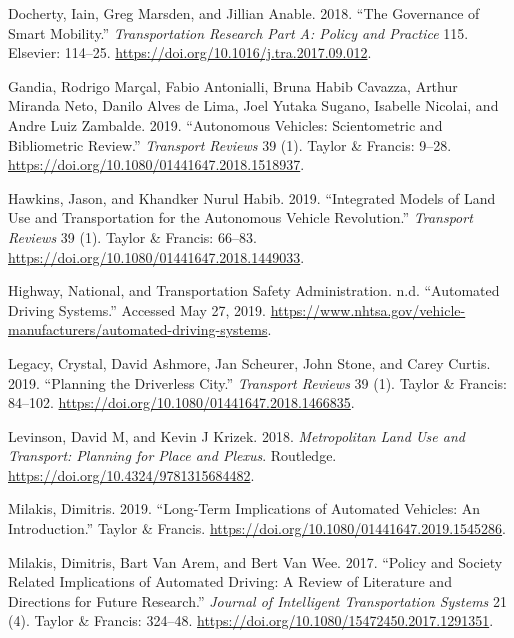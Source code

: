 \documentclass[12pt,]{article}
\begin{document}
\hypertarget{refs}{}
\leavevmode\hypertarget{ref-docherty2018governance}{}%
Docherty, Iain, Greg Marsden, and Jillian Anable. 2018. ``The Governance
of Smart Mobility.'' \emph{Transportation Research Part A: Policy and
Practice} 115. Elsevier: 114--25.
\url{https://doi.org/10.1016/j.tra.2017.09.012}.

\leavevmode\hypertarget{ref-gandia2019autonomous}{}%
Gandia, Rodrigo Marçal, Fabio Antonialli, Bruna Habib Cavazza, Arthur
Miranda Neto, Danilo Alves de Lima, Joel Yutaka Sugano, Isabelle
Nicolai, and Andre Luiz Zambalde. 2019. ``Autonomous Vehicles:
Scientometric and Bibliometric Review.'' \emph{Transport Reviews} 39
(1). Taylor \& Francis: 9--28.
\url{https://doi.org/10.1080/01441647.2018.1518937}.

\leavevmode\hypertarget{ref-hawkins2019integrated}{}%
Hawkins, Jason, and Khandker Nurul Habib. 2019. ``Integrated Models of
Land Use and Transportation for the Autonomous Vehicle Revolution.''
\emph{Transport Reviews} 39 (1). Taylor \& Francis: 66--83.
\url{https://doi.org/10.1080/01441647.2018.1449033}.

\leavevmode\hypertarget{ref-NHTSA2019ADS}{}%
Highway, National, and Transportation Safety Administration. n.d.
``Automated Driving Systems.'' Accessed May 27, 2019.
\url{https://www.nhtsa.gov/vehicle-manufacturers/automated-driving-systems}.

\leavevmode\hypertarget{ref-legacy2019planning}{}%
Legacy, Crystal, David Ashmore, Jan Scheurer, John Stone, and Carey
Curtis. 2019. ``Planning the Driverless City.'' \emph{Transport Reviews}
39 (1). Taylor \& Francis: 84--102.
\url{https://doi.org/10.1080/01441647.2018.1466835}.

\leavevmode\hypertarget{ref-levinson2018metropolitan}{}%
Levinson, David M, and Kevin J Krizek. 2018. \emph{Metropolitan Land Use
and Transport: Planning for Place and Plexus}. Routledge.
\url{https://doi.org/10.4324/9781315684482}.

\leavevmode\hypertarget{ref-milakis2019long}{}%
Milakis, Dimitris. 2019. ``Long-Term Implications of Automated Vehicles:
An Introduction.'' Taylor \& Francis.
\url{https://doi.org/10.1080/01441647.2019.1545286}.

\leavevmode\hypertarget{ref-milakis2017policy}{}%
Milakis, Dimitris, Bart Van Arem, and Bert Van Wee. 2017. ``Policy and
Society Related Implications of Automated Driving: A Review of
Literature and Directions for Future Research.'' \emph{Journal of
Intelligent Transportation Systems} 21 (4). Taylor \& Francis: 324--48.
\url{https://doi.org/10.1080/15472450.2017.1291351}.
\end{document}
